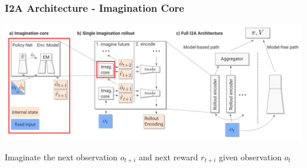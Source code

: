 \begin{frame}
    \frametitle{I2A Architecture - Imagination Core}


\includegraphics[width=\columnwidth]{./Images/i2a_all_imagination_core.png}%

Imaginate the next observation $o_{t+i}$ and next reward $r_{t+i}$ given observation $o_t$
\end{frame}
\clearpage



    

